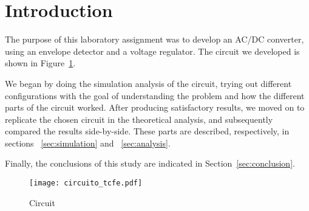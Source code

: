 \section{Introduction}
\label{sec:introduction}

The purpose of this laboratory assignment was to develop an AC/DC converter, using an envelope detector and a voltage regulator. The circuit we developed is shown in
 Figure~\ref{fig:circuit}.

We began by doing the simulation analysis of the circuit, trying out different configurations with the goal of understanding the problem and how the different 
parts of the circuit worked. After producing satisfactory results, we moved on to replicate the chosen circuit in the theoretical analysis, and subsequently compared the results side-by-side.
 These parts are described, respectively, in sections ~\ref{sec:simulation} and ~\ref{sec:analysis}. 

Finally, the conclusions of this study are indicated in
Section~\ref{sec:conclusion}.

\begin{figure}[ht] \centering
    \texttt{[image: circuito\_tcfe.pdf]}
    \caption{Circuit}
    \label{fig:circuit}
\end{figure}

